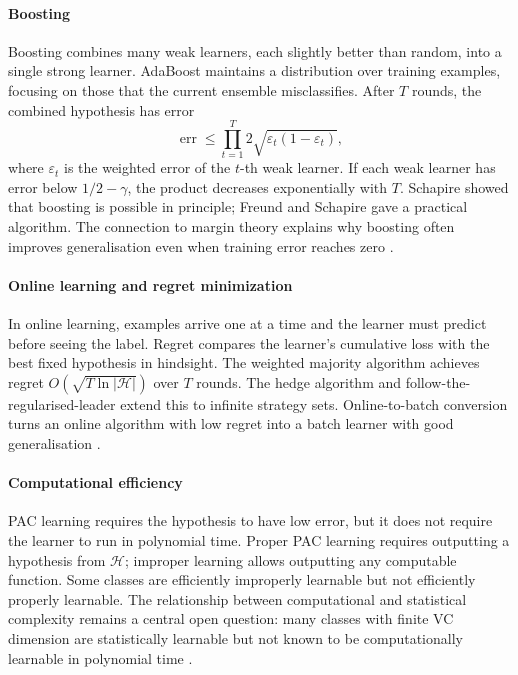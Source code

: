 \paragraph{Boosting}
Boosting combines many weak learners, each slightly better than random, into a single strong learner. AdaBoost maintains a distribution over training examples, focusing on those that the current ensemble misclassifies. After $T$ rounds, the combined hypothesis has error
\[
\operatorname{err}\leq\prod_{t=1}^T2\sqrt{\varepsilon_t(1-\varepsilon_t)},
\]
where $\varepsilon_t$ is the weighted error of the $t$-th weak learner. If each weak learner has error below $1/2-\gamma$, the product decreases exponentially with $T$. Schapire showed that boosting is possible in principle; Freund and Schapire gave a practical algorithm. The connection to margin theory explains why boosting often improves generalisation even when training error reaches zero \cite{colt_ref3}.

\paragraph{Online learning and regret minimization}
In online learning, examples arrive one at a time and the learner must predict before seeing the label. Regret compares the learner's cumulative loss with the best fixed hypothesis in hindsight. The weighted majority algorithm achieves regret $O(\sqrt{T\ln|\mathcal H|})$ over $T$ rounds. The hedge algorithm and follow-the-regularised-leader extend this to infinite strategy sets. Online-to-batch conversion turns an online algorithm with low regret into a batch learner with good generalisation \cite{colt_ref5}.

\paragraph{Computational efficiency}
PAC learning requires the hypothesis to have low error, but it does not require the learner to run in polynomial time. Proper PAC learning requires outputting a hypothesis from $\mathcal H$; improper learning allows outputting any computable function. Some classes are efficiently improperly learnable but not efficiently properly learnable. The relationship between computational and statistical complexity remains a central open question: many classes with finite VC dimension are statistically learnable but not known to be computationally learnable in polynomial time \cite{colt_ref1}.

